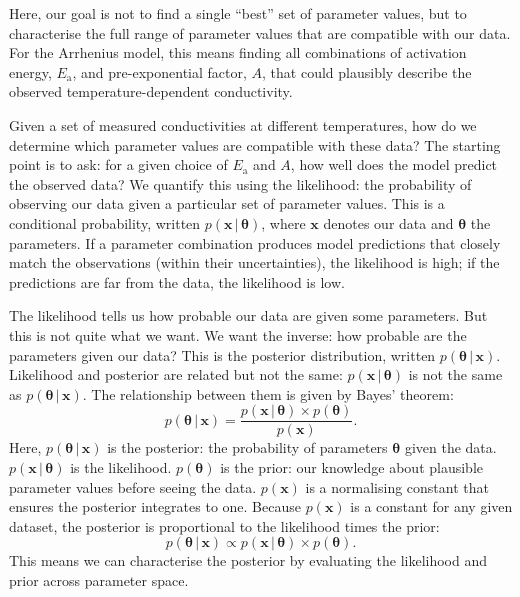 \documentclass[reprint,superscriptaddress,nobibnotes,nofootinbib,amsmath,amssymb,aps,hidelinks]{revtex4-2}
\newcommand{\pr}[2]{p(#1\,|\,#2)}
\newcommand{\Ea}{E_{\mathrm{a}}}
\begin{document}
Here, our goal is not to find a single ``best'' set of parameter values, but to characterise the full range of parameter values that are compatible with our data. 
For the Arrhenius model, this means finding all combinations of activation energy, $E_\mathrm{a}$, and pre-exponential factor, $A$, that could plausibly describe the observed temperature-dependent conductivity.

Given a set of measured conductivities at different temperatures, how do we determine which parameter values are compatible with these data? 
The starting point is to ask: for a given choice of $\Ea$ and $A$, how well does the model predict the observed data?
We quantify this using the likelihood: the probability of observing our data given a particular set of parameter values. This is a conditional probability, written $\pr{\bm{x}}{\bm{\theta}}$, where $\bm{x}$ denotes our data and $\bm{\theta}$ the parameters. 
If a parameter combination produces model predictions that closely match the observations (within their uncertainties), the likelihood is high; if the predictions are far from the data, the likelihood is low.

The likelihood tells us how probable our data are given some parameters. 
But this is not quite what we want. 
We want the inverse: how probable are the parameters given our data? 
This is the posterior distribution, written $\pr{\bm{\theta}}{\bm{x}}$.
Likelihood and posterior are related but not the same: $\pr{\bm{x}}{\bm{\theta}}$ is not the same as $\pr{\bm{\theta}}{\bm{x}}$. 
The relationship between them is given by Bayes' theorem:
\begin{equation}
\pr{\bm{\theta}}{\bm{x}} = \frac{\pr{\bm{x}}{\bm{\theta}} \times p(\bm{\theta})}{p(\bm{x})}.
\end{equation}
Here, $\pr{\bm{\theta}}{\bm{x}}$ is the posterior: the probability of parameters $\bm{\theta}$ given the data. 
$\pr{\bm{x}}{\bm{\theta}}$ is the likelihood. 
$p(\bm{\theta})$ is the prior: our knowledge about plausible parameter values before seeing the data. 
$p(\bm{x})$ is a normalising constant that ensures the posterior integrates to one.
Because $p(\bm{x})$ is a constant for any given dataset, the posterior is proportional to the likelihood times the prior:
\begin{equation}
\pr{\bm{\theta}}{\bm{x}} \propto \pr{\bm{x}}{\bm{\theta}} \times p(\bm{\theta}).
\end{equation}
This means we can characterise the posterior by evaluating the likelihood and prior across parameter space.
\end{document}
